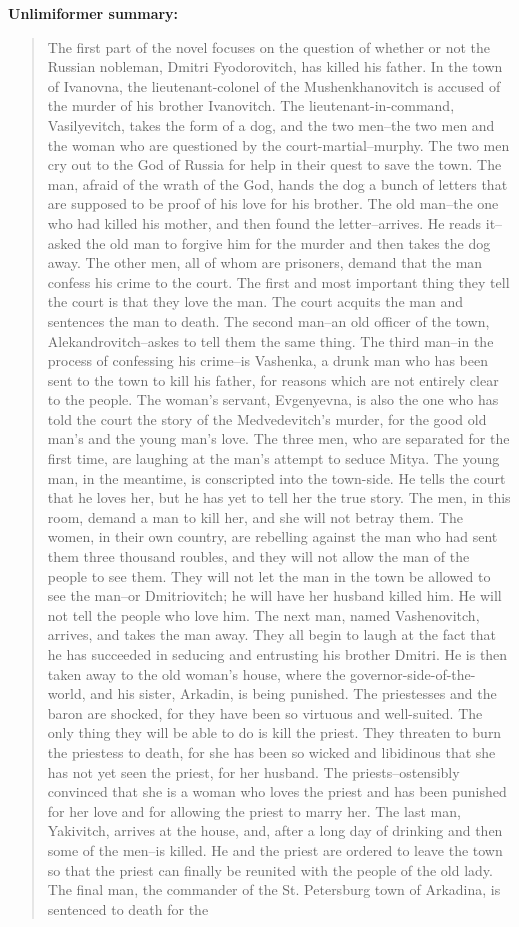 \documentclass{article}
\newcommand{\ours}{Unlimiformer\xspace}
\begin{document}
\textbf{\ours summary:}
\begin{quote}
    The first part of the novel focuses on the question of whether or not the Russian nobleman, Dmitri Fyodorovitch, has killed his father. In the town of Ivanovna, the lieutenant-colonel of the Mushenkhanovitch is accused of the murder of his brother Ivanovitch. The lieutenant-in-command, Vasilyevitch, takes the form of a dog, and the two men--the two men and the woman who are questioned by the court-martial--murphy. The two men cry out to the God of Russia for help in their quest to save the town. The man, afraid of the wrath of the God, hands the dog a bunch of letters that are supposed to be proof of his love for his brother. The old man--the one who had killed his mother, and then found the letter--arrives. He reads it--asked the old man to forgive him for the murder and then takes the dog away. The other men, all of whom are prisoners, demand that the man confess his crime to the court. The first and most important thing they tell the court is that they love the man. The court acquits the man and sentences the man to death. The second man--an old officer of the town, Alekandrovitch--askes to tell them the same thing. The third man--in the process of confessing his crime--is Vashenka, a drunk man who has been sent to the town to kill his father, for reasons which are not entirely clear to the people. The woman's servant, Evgenyevna, is also the one who has told the court the story of the Medvedevitch's murder, for the good old man's and the young man's love. The three men, who are separated for the first time, are laughing at the man's attempt to seduce Mitya. The young man, in the meantime, is conscripted into the town-side. He tells the court that he loves her, but he has yet to tell her the true story. The men, in this room, demand a man to kill her, and she will not betray them. The women, in their own country, are rebelling against the man who had sent them three thousand roubles, and they will not allow the man of the people to see them. They will not let the man in the town be allowed to see the man--or Dmitriovitch; he will have her husband killed him. He will not tell the people who love him. The next man, named Vashenovitch, arrives, and takes the man away. They all begin to laugh at the fact that he has succeeded in seducing and entrusting his brother Dmitri. He is then taken away to the old woman's house, where the governor-side-of-the-world, and his sister, Arkadin, is being punished. The priestesses and the baron are shocked, for they have been so virtuous and well-suited. The only thing they will be able to do is kill the priest. They threaten to burn the priestess to death, for she has been so wicked and libidinous that she has not yet seen the priest, for her husband. The priests--ostensibly convinced that she is a woman who loves the priest and has been punished for her love and for allowing the priest to marry her. The last man, Yakivitch, arrives at the house, and, after a long day of drinking and then some of the men--is killed. He and the priest are ordered to leave the town so that the priest can finally be reunited with the people of the old lady. The final man, the commander of the St. Petersburg town of Arkadina, is sentenced to death for the 
\end{quote}
\end{document}
